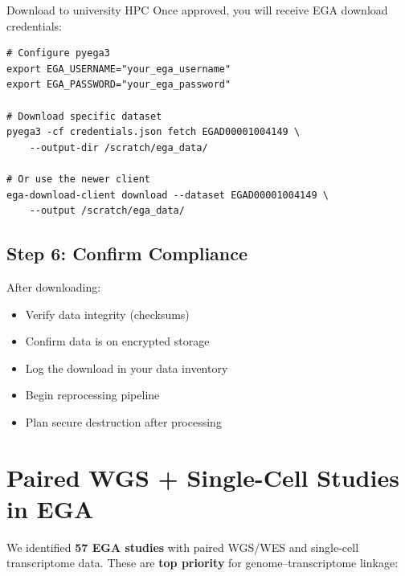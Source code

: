 \documentclass[11pt,letterpaper]{article}
\begin{document}
\begin{actionbox}{Download to university HPC}
Once approved, you will receive EGA download credentials:
\begin{verbatim}
# Configure pyega3
export EGA_USERNAME="your_ega_username"
export EGA_PASSWORD="your_ega_password"

# Download specific dataset
pyega3 -cf credentials.json fetch EGAD00001004149 \
    --output-dir /scratch/ega_data/

# Or use the newer client
ega-download-client download --dataset EGAD00001004149 \
    --output /scratch/ega_data/
\end{verbatim}
\end{actionbox}

\subsection{Step 6: Confirm Compliance}

After downloading:
\begin{itemize}[nosep]
    \item Verify data integrity (checksums)
    \item Confirm data is on encrypted storage
    \item Log the download in your data inventory
    \item Begin reprocessing pipeline
    \item Plan secure destruction after processing
\end{itemize}

\section{Paired WGS + Single-Cell Studies in EGA}

We identified \textbf{57 EGA studies} with paired WGS/WES and
single-cell transcriptome data. These are \textbf{top priority} for
genome--transcriptome linkage:
\end{document}
